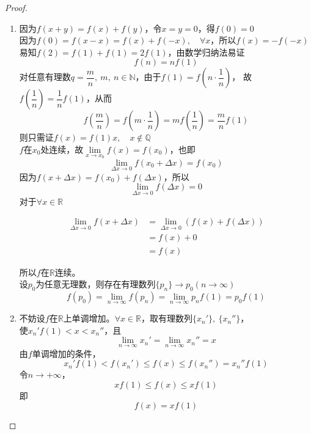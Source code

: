 \begin{proof}
    
    \begin{enumerate}
        
        \item 
            因为$f(x+y) = f(x) + f(y)$，令$x=y=0$，得$f(0)=0$\\
            因为$f(0) = f(x-x) = f(x) + f(-x), \quad \forall x$，所以$f(x) = -f(-x)$\\
            易知$f(2) = f(1) + f(1) = 2f(1)$，由数学归纳法易证
            $$f(n) = nf(1)$$
            对任意有理数$q=\dfrac{m}{n},\ m,\ n \in \mathbb{N}$，由于$f(1) = f\left(n \cdot \dfrac{1}{n}\right)$，
            故$f\left(\dfrac{1}{n}\right) = \dfrac{1}{n}f(1)$，从而
            $$f\left(\dfrac{m}{n}\right) = f\left(m \cdot \dfrac{1}{n}\right) = mf\left(\dfrac{1}{n}\right) = \dfrac{m}{n}f(1)$$
            则只需证$f(x) = f(1)x,\quad x \notin \mathbb{Q}$\\
            $f$在$x_0$处连续，故$\lim\limits_{x\to x_0}{f(x)} = f(x_0)$，也即
            $$\lim\limits_{\Delta x\to0}{f(x_0+\Delta x)} = f(x_0)$$
            因为$f(x+\Delta x) = f(x_0) + f(\Delta x)$，所以
            $$\lim\limits_{\Delta x\to 0}{f(\Delta x)} = 0$$
            对于$\forall x \in \mathbb{R}$

            \begin{align*}
                \lim\limits_{\Delta x\to 0}{f(x+\Delta x)} &= \lim\limits_{\Delta x\to 0}{(f(x) + f(\Delta x))}\\
                & = f(x) + 0\\
                & = f(x)
            \end{align*}

            所以$f$在$\mathbb{R}$连续。\\
            设$p_0$为任意无理数，则存在有理数列$\{p_n\}\to p_0(n\to\infty)$
            $$f(p_0) = \lim_{n\to\infty}{f(p_n)} = \lim_{n\to\infty}{p_nf(1)} = p_0f(1)$$
            
        \item 
            不妨设$f$在$\mathbb{R}$上单调增加。$\forall x \in \mathbb{R}$，取有理数列$\{x_n'\},\ \{x_n''\}$，\\
            使$x_n'f(1) < x < x_n''$，且
            $$\lim_{n\to\infty}{x_n'} = \lim_{n\to\infty}{x_n''}=x$$
            由$f$单调增加的条件，
            $$x_n'f(1) < f(x_n') \leq f(x) \leq f(x_n'') = x_n''f(1)$$
            令$n\to+\infty$，
            $$xf(1) \leq f(x) \leq xf(1)$$
            即
            $$f(x) = xf(1)$$

    \end{enumerate}

\end{proof}

